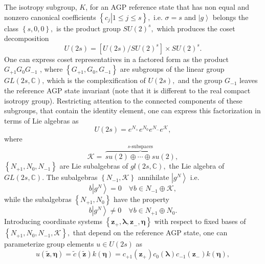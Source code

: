 \documentclass[12pt,aps,amsfonts,amssymb,tightenlines]{revtex4}%
\begin{document}
The isotropy subgroup, $K$, for an AGP reference state that has non equal and
nonzero canonical coefficients $\left\{  \left.  c_{j}\right\vert 1\leq j\leq
s\right\}  ,$ i.e. $\sigma=s$ and $\left\vert g\right\rangle $ belongs the
class $\left\{  s,0,0\right\}  ,$ is the product group $SU\left(  2\right)
^{s},$ which produces the coset decomposition
\begin{equation}
U\left(  2s\right)  =\left[  U\left(  2s\right)  /SU\left(  2\right)
^{s}\right]  \times SU\left(  2\right)  ^{s}.
\end{equation}
One can express coset representatives in a factored form as the product
$G_{+1}G_{0}G_{-1}$ \cite{Zhang90}, where $\left\{  G_{+1},G_{0}%
,G_{-1}\right\}  $ are subgroups of the linear group $GL\left(  2s,\mathbb{C}%
\right)  ,\ $which is the complexification of $U\left(  2s\right)  ,$ and the
group $G_{-1}$ leaves the reference AGP state invariant (note that it is
different to the real compact isotropy group). Restricting attention to the
connected components of these subgroups, that contain the identity element,
one can express this factorization in terms of Lie algebras as
\begin{equation}
U\left(  2s\right)  =e^{N_{+}}e^{N_{0}}e^{N_{-}}e^{\mathcal{K}},
\end{equation}
where
\begin{equation}
\mathcal{K}=\,\overset{s\text{-subspaces}}{\overbrace{su\left(  2\right)
\oplus\cdots\oplus su\left(  2\right)  }},
\end{equation}
$\left\{  N_{+1},N_{0},N_{-1}\right\}  $ are Lie subalgebras of $gl\left(
2s,\mathbb{C}\right)  ,$ the Lie algebra of $GL\left(  2s,\mathbb{C}\right)
$. The subalgebras $\left\{  N_{-1},\mathcal{K}\right\}  $ annihilate
$\left\vert g^{N}\right\rangle $ i.e.
\begin{equation}
b\left\vert g^{N}\right\rangle =0\quad\forall b\in N_{-1}\oplus\mathcal{K},
\end{equation}
while the subalgebras $\left\{  N_{+1},N_{0}\right\}  $ have the property
\begin{equation}
b\left\vert g^{N}\right\rangle \neq0\quad\forall b\in N_{+1}\oplus N_{0}.
\end{equation}
Introducing coordinate systems $\left\{  \mathbf{z}_{+},\mathbf{\lambda,z}%
_{-},\mathbf{\eta}\right\}  $ with respect to fixed bases of $\left\{
N_{+1},N_{0},N_{-1},\mathcal{K}\right\}  ,$ that depend on the reference AGP
state, one can parameterize group elements $u\in U\left(  2s\right)  $ as
\begin{equation}
u\left(  \mathbf{\tilde{z},\eta}\right)  =\tilde{c}\left(  \mathbf{\tilde{z}%
}\right)  k\left(  \mathbf{\eta}\right)  =c_{+1}\left(  \mathbf{z}_{+}\right)
c_{0}\left(  \mathbf{\lambda}\right)  c_{-1}\left(  \mathbf{z}_{-}\right)
k\left(  \mathbf{\eta}\right)  ,
\end{equation}
\end{document}
